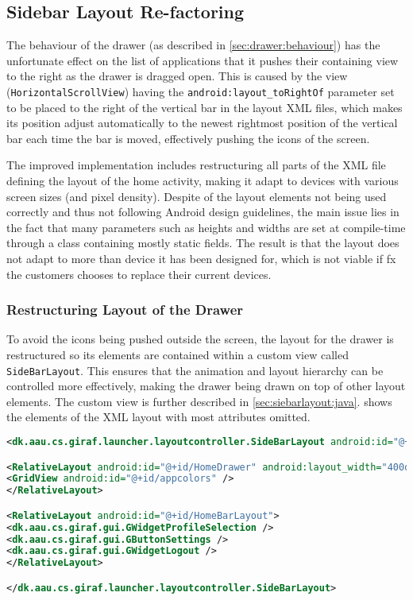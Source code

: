 \subsection{Sidebar Layout Re-factoring}
The behaviour of the drawer (as described in \cref{sec:drawer:behaviour}) has the unfortunate effect on the list of applications that it pushes their containing view to the right as the drawer is dragged open.
This is caused by the view (\lstinline|HorizontalScrollView|) having the  \lstinline{android:layout_toRightOf} parameter set to be placed to the right of the vertical bar in the layout XML files, which makes its position adjust automatically to the newest rightmost position of the vertical bar each time the bar is moved, effectively pushing the icons of the screen.

The improved implementation includes restructuring all parts of the XML file defining the layout of the home activity, making it adapt to devices with various screen sizes (and pixel density).
Despite of the layout elements not being used correctly and thus not following Android design guidelines, the main issue lies in the fact that many parameters such as heights and widths are set at compile-time through a class containing mostly static fields.
The result is that the layout does not adapt to more than device it has been designed for, which is not viable if fx the customers chooses to replace their current devices.

\subsubsection{Restructuring Layout of the Drawer}\label{sec:sidebarlayout:xml}
To avoid the icons being pushed outside the screen, the layout for the drawer is restructured so its elements are contained within a custom view called \lstinline|SideBarLayout|.
This ensures that the animation and layout hierarchy can be controlled more effectively, making the drawer being drawn on top of other layout elements.
The custom view is further described in \cref{sec:siebarlayout:java}.
 shows the elements of the XML layout with most attributes omitted.

\begin{lstlisting}[caption={Structure of the XML layout of the drawer.},label={lst:sidebarlayout}, language=XML]
<dk.aau.cs.giraf.launcher.layoutcontroller.SideBarLayout android:id="@+id/SideBarLayout" android:layout_marginLeft="-400dp">

<RelativeLayout android:id="@+id/HomeDrawer" android:layout_width="400dp">
<GridView android:id="@+id/appcolors" />
</RelativeLayout>

<RelativeLayout android:id="@+id/HomeBarLayout">
<dk.aau.cs.giraf.gui.GWidgetProfileSelection />
<dk.aau.cs.giraf.gui.GButtonSettings />
<dk.aau.cs.giraf.gui.GWidgetLogout />
</RelativeLayout>

</dk.aau.cs.giraf.launcher.layoutcontroller.SideBarLayout>
\end{lstlisting}

